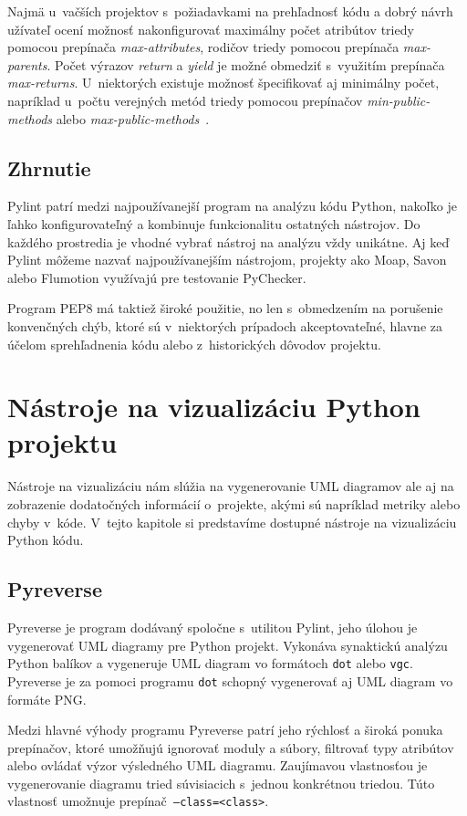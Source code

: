 \documentclass[11pt,oneside,final]{fithesis2}
\begin{document}
    Najmä u~vačších projektov s~požiadavkami na prehľadnosť kódu a dobrý návrh užívateľ ocení možnosť nakonfigurovať maximálny počet atribútov triedy pomocou prepínača \textit{max-attributes}, rodičov triedy pomocou prepínača \textit{max-parents}. Počet výrazov \textit{return} a \textit{yield} je možné obmedziť s~využitím prepínača \textit{max-returns}. U~niektorých existuje možnosť špecifikovať aj minimálny počet, napríklad u~počtu verejných metód triedy pomocou prepínačov \textit{min-public-methods} alebo \textit{max-public-methods}~\cite{pylintfeatures}.
    
\subsection{Zhrnutie}
Pylint patrí medzi najpoužívanejší program na analýzu kódu Python, nakoľko je ľahko konfigurovateľný a kombinuje funkcionalitu ostatných nástrojov. Do každého prostredia je vhodné vybrať nástroj na analýzu vždy unikátne. Aj keď Pylint môžeme nazvať najpoužívanejším nástrojom, projekty ako Moap, Savon alebo Flumotion využívajú pre testovanie PyChecker.
    
    Program PEP8 má taktiež široké použitie, no len s~obmedzením na porušenie konvenčných chýb, ktoré  sú v~niektorých prípadoch akceptovateľné, hlavne za účelom sprehľadnenia kódu alebo z~historických dôvodov projektu.
    	
	
	\section{Nástroje na vizualizáciu Python projektu}
	
	Nástroje na vizualizáciu nám slúžia na vygenerovanie UML diagramov ale aj na zobrazenie dodatočných informácií o~projekte, akými sú napríklad metriky alebo chyby v~kóde. V~tejto kapitole si predstavíme dostupné nástroje na vizualizáciu Python kódu.
	
	\subsection{Pyreverse}
		Pyreverse je program dodávaný spoločne s~utilitou Pylint, jeho úlohou je vygenerovať UML diagramy pre Python projekt. Vykonáva synaktickú analýzu Python balíkov a vygeneruje UML diagram vo formátoch \texttt{dot} alebo \texttt{vgc}. Pyreverse je za pomoci programu \texttt{dot} schopný vygenerovať aj UML diagram vo formáte PNG.
		
		Medzi hlavné výhody programu Pyreverse patrí jeho rýchlosť a široká ponuka prepínačov, ktoré umožňujú ignorovať moduly a súbory, filtrovať typy atribútov alebo ovládať výzor výsledného UML diagramu.		
		Zaujímavou vlastnosťou je vygenerovanie diagramu tried súvisiacich s~jednou konkrétnou triedou. Túto vlastnosť umožnuje prepínač\texttt{ --class=<class>}.
		
\end{document}
